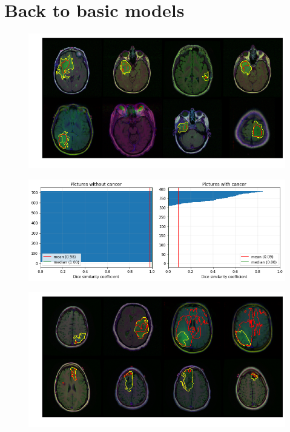 \section{Back to basic models}

\begin{figure}[h!]
    \centering
    \includegraphics[width=1.0\textwidth]{images/logreg_mask}
    \caption{}
    \label{fig:logreg_mask}
\end{figure}

\begin{figure}[h!]
    \centering
    \includegraphics[width=1.0\textwidth]{images/logreg_dsc}
    \caption{}
    \label{fig:logreg_dsc}
\end{figure}

\begin{figure}[h!]
    \centering
    \includegraphics[width=1.0\textwidth]{images/simcnn_mask}
    \caption{}
    \label{fig:simcnn_mask}
\end{figure}

